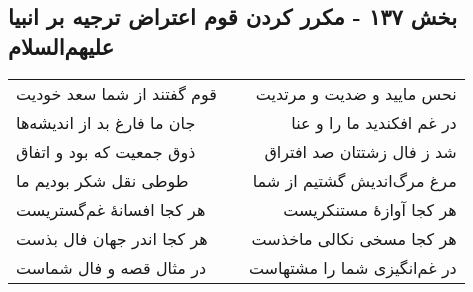 \begin{center}
\section*{بخش ۱۳۷ - مکرر کردن قوم اعتراض ترجیه بر انبیا علیهم‌السلام}
\label{sec:sh137}
\begin{longtable}{l p{0.5cm} r}
قوم گفتند از شما سعد خودیت
&&
نحس مایید و ضدیت و مرتدیت
\\
جان ما فارغ بد از اندیشه‌ها
&&
در غم افکندید ما را و عنا
\\
ذوق جمعیت که بود و اتفاق
&&
شد ز فال زشتتان صد افتراق
\\
طوطی نقل شکر بودیم ما
&&
مرغ مرگ‌اندیش گشتیم از شما
\\
هر کجا افسانهٔ غم‌گستریست
&&
هر کجا آوازهٔ مستنکریست
\\
هر کجا اندر جهان فال بذست
&&
هر کجا مسخی نکالی ماخذست
\\
در مثال قصه و فال شماست
&&
در غم‌انگیزی شما را مشتهاست
\\
\end{longtable}
\end{center}
